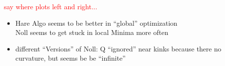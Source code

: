\textcolor{red}{say where plots left and right...}
%
%
%
%
%
%
%
%
%
%

\begin{itemize}
	\item Hare Algo seems to be better in ``global'' optimization \\
	Noll seems to get stuck in local Minima more often
	\item different ``Versions'' of Noll: Q ``ignored'' near kinks because there no curvature, but seems be be ``infinite''
\end{itemize}